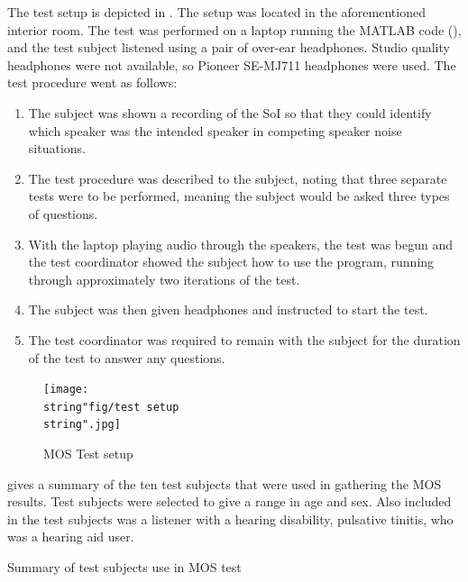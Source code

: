The test setup is depicted in . The setup
was located in the aforementioned interior room. The test was performed
on a laptop running the MATLAB code (), and the
test subject listened using a pair of over-ear headphones. Studio
quality headphones were not available, so Pioneer SE-MJ711 headphones
were used. The test procedure went as follows:
\begin{enumerate}
\item The subject was shown a recording of the \acf{SoI} so that they could
identify which speaker was the intended speaker in competing speaker
noise situations.
\item The test procedure was described to the subject, noting that three
separate tests were to be performed, meaning the subject would be
asked three types of questions.
\item With the laptop playing audio through the speakers, the test was begun
and the test coordinator showed the subject how to use the program,
running through approximately two iterations of the test.
\item The subject was then given headphones and instructed to start the
test.
\item The test coordinator was required to remain with the subject for the
duration of the test to answer any questions.
\end{enumerate}
\begin{figure}
\begin{centering}
\texttt{[image: \\string"fig/test setup\\string".jpg]}
\par\end{centering}

\protect\caption{\label{fig:MOS-Test-setup}MOS Test setup}
\end{figure}


\clearpage{}

 gives a summary of the ten test subjects
that were used in gathering the \ac{MOS} results. Test subjects were
selected to give a range in age and sex. Also included in the test
subjects was a listener with a hearing disability, pulsative tinitis,
who was a hearing aid user.

\begin{table}
\protect\caption{\label{tab:MOS-Subject-summary}Summary of test subjects use in \ac{MOS}
test}


\centering{}
\end{table}




